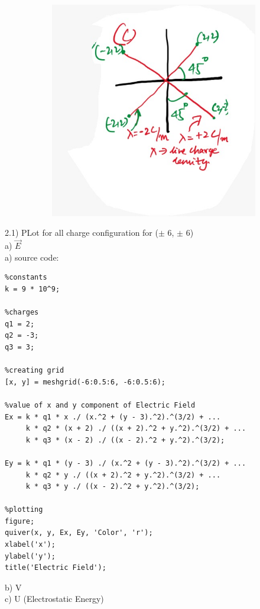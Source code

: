 \documentclass[journal,12pt,onecolumn]{IEEEtran}
\theoremstyle{remark}
\begin{document}
\begin{figure}[h]
\begin{subfigure}{0.3\textwidth}
  \end{subfigure}
  \begin{subfigure}{0.3\textwidth}
    \centering
    \includegraphics[width=\linewidth]{q3.jpeg}
  \end{subfigure}
\end{figure}

2.1) PLot for all charge configuration for ($\pm$ 6, $\pm$ 6) \\
a) $\vec{E}$ \\
\solution
a) source code:
\begin{lstlisting}
%constants
k = 9 * 10^9;

%charges
q1 = 2;
q2 = -3;
q3 = 3;

%creating grid
[x, y] = meshgrid(-6:0.5:6, -6:0.5:6);

%value of x and y component of Electric Field
Ex = k * q1 * x ./ (x.^2 + (y - 3).^2).^(3/2) + ...
     k * q2 * (x + 2) ./ ((x + 2).^2 + y.^2).^(3/2) + ...
     k * q3 * (x - 2) ./ ((x - 2).^2 + y.^2).^(3/2);

Ey = k * q1 * (y - 3) ./ (x.^2 + (y - 3).^2).^(3/2) + ...
     k * q2 * y ./ ((x + 2).^2 + y.^2).^(3/2) + ...
     k * q3 * y ./ ((x - 2).^2 + y.^2).^(3/2);

%plotting
figure;
quiver(x, y, Ex, Ey, 'Color', 'r');
xlabel('x');
ylabel('y');
title('Electric Field');
\end{lstlisting}



b) V \\
c) U (Electrostatic Energy) \\
\end{document}
